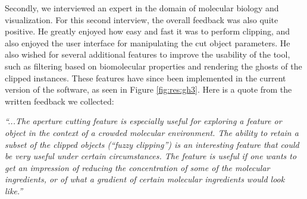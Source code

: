 
Secondly, we interviewed an expert in the domain of molecular biology and visualization. 
For this second interview, the overall feedback was also quite positive.
He greatly enjoyed how easy and fast it was to perform clipping, and also enjoyed the user interface for manipulating the cut object parameters.
He also wished for several additional features to improve the usability of the tool, such as filtering based on biomolecular properties and rendering the ghosts of the clipped instances.
These features have since been implemented in the current version of the software, as seen in Figure \ref{fig:res:gh3}.
Here is a quote from the written feedback we collected:


\textit{``...The aperture cutting feature is especially useful for exploring a feature or object in the context of a crowded molecular environment.
The ability to retain a subset of the clipped objects (``fuzzy clipping'') is an interesting feature that could be very useful under certain circumstances.
The feature is useful if one wants to get an impression of reducing the concentration of some of the molecular ingredients, or of what a gradient of certain molecular ingredients would look like.''}


